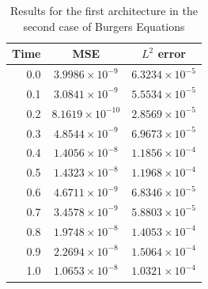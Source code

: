 \documentclass[12pt,letterpaper]{article}
\begin{document}
\begin{table}[H]
  \begin{center}
  \begin{tabular}{ r | c  c }
  \textbf{Time} & \textbf{MSE} & \textbf{$L^2$ error} \\ \hline
  0.0 & $ 3.9986\times 10^{-9}$ & $ 6.3234\times 10^{-5} $ \\
  0.1 & $ 3.0841\times 10^{-9}$ & $ 5.5534\times 10^{-5} $ \\
  0.2 & $ 8.1619\times 10^{-10}$ & $ 2.8569\times 10^{-5} $ \\
  0.3 & $ 4.8544\times 10^{-9}$ & $ 6.9673\times 10^{-5} $ \\
  0.4 & $ 1.4056\times 10^{-8}$ & $ 1.1856\times 10^{-4} $ \\
  0.5 & $ 1.4323\times 10^{-8}$ & $ 1.1968\times 10^{-4} $ \\
  0.6 & $ 4.6711\times 10^{-9}$ & $ 6.8346\times 10^{-5} $ \\
  0.7 & $ 3.4578\times 10^{-9}$ & $ 5.8803\times 10^{-5} $ \\
  0.8 & $ 1.9748\times 10^{-8}$ & $ 1.4053\times 10^{-4} $ \\
  0.9 & $ 2.2694\times 10^{-8}$ & $ 1.5064\times 10^{-4} $ \\
  1.0 & $ 1.0653\times 10^{-8}$ & $ 1.0321\times 10^{-4} $ \\
  \end{tabular}
  \caption{Results for the first architecture in the second case of Burgers Equations}
  \label{tab:B21}
  \end{center}
  \end{table}
\end{document}
